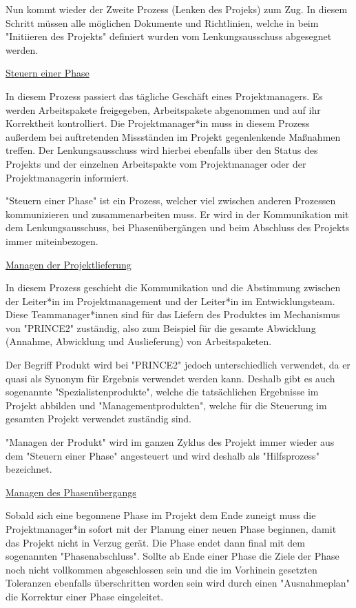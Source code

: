 Nun kommt wieder der Zweite Prozess (Lenken des Projeks) zum Zug. In diesem Schritt müssen alle möglichen Dokumente und Richtlinien, welche in beim "Initiieren des Projekts" definiert wurden vom Lenkungsausschuss abgesegnet werden. \cite{Prince2} \cite{Stakeholder}

\underline{Steuern einer Phase}

In diesem Prozess passiert das tägliche Geschäft eines Projektmanagers. Es werden Arbeitspakete freigegeben, Arbeitspakete abgenommen und auf ihr Korrektheit kontrolliert. Die Projektmanager*in muss in diesem Prozess außerdem bei auftretenden Missständen im Projekt gegenlenkende Maßnahmen treffen. Der Lenkungsausschuss wird hierbei ebenfalls über den Status des Projekts und der einzelnen Arbeitspakte vom Projektmanager oder der Projektmanagerin informiert.

"Steuern einer Phase" ist ein Prozess, welcher viel zwischen anderen Prozessen kommunizieren und zusammenarbeiten muss. Er wird in der Kommunikation mit dem Lenkungsausschuss, bei Phasenübergängen und beim Abschluss des Projekts immer miteinbezogen. \cite{Prince2}

\underline{Managen der Projektlieferung}

In diesem Prozess geschieht die Kommunikation und die Abstimmung zwischen der Leiter*in im Projektmanagement und der Leiter*in im Entwicklungsteam. Diese Teammanager*innen sind für das Liefern des Produktes im Mechanismus von "PRINCE2" zuständig, also zum Beispiel für die gesamte Abwicklung (Annahme, Abwicklung und Auslieferung) von Arbeitspaketen.

Der Begriff Produkt wird bei "PRINCE2" jedoch unterschiedlich verwendet, da er quasi als Synonym für Ergebnis verwendet werden kann. Deshalb gibt es auch sogenannte "Spezialistenprodukte", welche die tatsächlichen Ergebnisse im Projekt abbilden und "Managementprodukten", welche für die Steuerung im gesamten Projekt verwendet zuständig sind.

"Managen der Produkt" wird im ganzen Zyklus des Projekt immer wieder aus dem "Steuern einer Phase" angesteuert und wird deshalb als "Hilfsprozess" bezeichnet. \cite{Prince2}

\underline{Managen des Phasenübergangs}

Sobald sich eine begonnene Phase im Projekt dem Ende zuneigt muss die Projektmanager*in sofort mit der Planung einer neuen Phase beginnen, damit das Projekt nicht in Verzug gerät. Die Phase endet dann final mit dem sogenannten "Phasenabschluss". Sollte ab Ende einer Phase die Ziele der Phase noch nicht vollkommen abgeschlossen sein und die im Vorhinein gesetzten Toleranzen ebenfalls überschritten worden sein wird durch einen "Ausnahmeplan" die Korrektur einer Phase eingeleitet.

